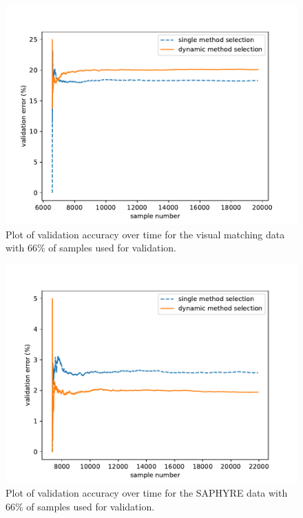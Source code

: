 \documentclass[12pt]{uthesis-v12}  %
\begin{document}
\begin{figure}[!t]
\centering
\includegraphics[width=\textwidth]{switching/vismatch/0.66/vismatch66}
\caption{Plot of validation accuracy over time for the visual matching data with 66\% of samples used for validation.}
\label{vismatch-66}
\end{figure}

\begin{figure}[!t]
\centering
\includegraphics[width=\textwidth]{switching/saphyre/0.66/saphyre66}
\caption{Plot of validation accuracy over time for the SAPHYRE data with 66\% of samples used for validation.}
\label{saphyre-66}
\end{figure}
\end{document}
